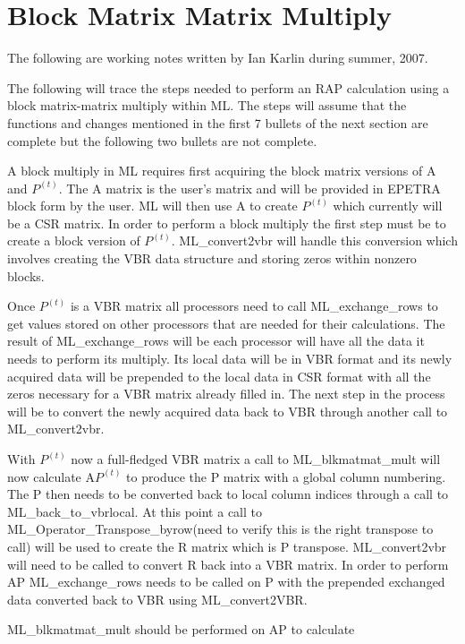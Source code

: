 \documentclass[10pt,letter,relax]{SANDreport}
\begin{document}

\section{Block Matrix Matrix Multiply}

The following are working notes written by Ian Karlin during summer, 2007.

The following will trace the steps needed to perform an RAP calculation using a block matrix-matrix multiply within ML.  The steps will assume that the functions and changes mentioned in the first 7 bullets of the next section are complete but the following two bullets are not complete.

A block multiply in ML requires first acquiring the block matrix versions of A and $P^(t)$.  The A matrix is the user's matrix and will be provided in EPETRA block form by the user.  ML will then use A to create $P^(t)$ which currently will be a CSR matrix.  In order to perform a block multiply the first step must be to create a block version of $P^(t)$.
ML\_convert2vbr will handle this conversion which involves creating the VBR data structure and storing zeros within nonzero blocks.

Once $P^(t)$ is a VBR matrix all processors need to call ML\_exchange\_rows to
get values stored on other processors that are needed for their calculations.
The result of ML\_exchange\_rows will be each processor will have all the data
it needs to perform its multiply.  Its local data will be in VBR format and its
newly acquired data will be prepended to the local data in CSR format with all
the zeros necessary for a VBR matrix already filled in.  The next step in the
process will be to convert the newly acquired data back to VBR through another call to ML\_convert2vbr.

With $P^(t)$ now a full-fledged VBR matrix a call to ML\_blkmatmat\_mult will now calculate A$P^(t)$ to produce the P matrix with a global column numbering.  The P then needs to be converted back to local column indices through a call to ML\_back\_to\_vbrlocal.  At this point a call to ML\_Operator\_Transpose\_byrow(need to verify this is the right transpose to call) will be used to create the R matrix which is P transpose.  ML\_convert2vbr will need to be called to convert R back into a VBR matrix.  In order to perform AP ML\_exchange\_rows needs to be called on P with the prepended exchanged data converted back to VBR using ML\_convert2VBR.

ML\_blkmatmat\_mult should be performed on AP to calculate
\end{document}
